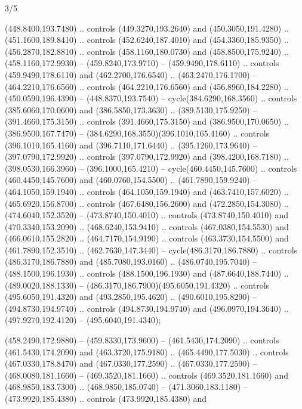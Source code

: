 \begin{flagdescription}{3/5}
\begin{scope}[shift={(0.5\flaglength,0.5\flagwidth)},scale=\flagwidth/510]
\begin{scope}[y=0.80pt, x=0.80pt, yscale=-1.06, xscale=1.06,yshift=-240pt,xshift=-400pt]
\begin{scope}[cm={{0.83333,0.0,0.0,0.83333,(154.64672,48.64761)}}]
\begin{scope}[cm={{0.93334,0.0,0.0,0.93334,(-4.86471,22.64035)}}]
\begin{scope}[line width=0.489\lw]
\begin{scope}[draw=black,fill=cd67c59]
 (448.8400,193.7480) .. controls (449.3270,193.2640) and
  (450.3050,191.4280) .. (451.1600,189.8410) .. controls (452.6240,187.4010) and
  (454.3360,185.9350) .. (456.2870,182.8810) .. controls (458.1160,180.0730) and
  (458.8500,175.9240) .. (458.1160,172.9930) -- (459.8240,173.9710) --
  (459.9490,178.6110) .. controls (459.9490,178.6110) and (462.2700,176.6540) ..
  (463.2470,176.1700) -- (464.2210,176.6560) .. controls (464.2210,176.6560) and
  (456.8960,184.2280) .. (450.0590,196.4390) -- (448.8370,193.7540) --
  cycle(384.6290,168.3560) .. controls (385.6060,170.0600) and
  (386.5850,173.3630) .. (389.5130,175.9250) -- (391.4660,175.3150) .. controls
  (391.4660,175.3150) and (386.9500,170.0650) .. (386.9500,167.7470) --
  (384.6290,168.3550)(396.1010,165.4160) .. controls (396.1010,165.4160) and
  (396.7110,171.6440) .. (395.1260,173.9640) -- (397.0790,172.9920) .. controls
  (397.0790,172.9920) and (398.4200,168.7180) .. (398.0530,166.3960) --
  (396.1000,165.4210) -- cycle(460.4450,145.7600) .. controls
  (460.4450,145.7600) and (460.0760,154.5500) .. (461.7890,159.9240) --
  (464.1050,159.1940) .. controls (464.1050,159.1940) and (463.7410,157.6020) ..
  (465.6920,156.8700) .. controls (467.6480,156.2600) and (472.2850,154.3080) ..
  (474.6040,152.3520) -- (473.8740,150.4010) .. controls (473.8740,150.4010) and
  (470.3340,153.2090) .. (468.6240,153.9410) .. controls (467.0380,154.5530) and
  (466.0610,155.2820) .. (464.7170,154.9190) .. controls (463.3730,154.5500) and
  (461.7890,152.3510) .. (462.7630,147.3440) -- cycle(486.3170,186.7880) ..
  controls (486.3170,186.7880) and (485.7080,193.0160) .. (486.0740,195.7040) --
  (488.1500,196.1930) .. controls (488.1500,196.1930) and (487.6640,188.7440) ..
  (489.0020,188.1330) -- (486.3170,186.7900)(495.6050,191.4320) .. controls
  (495.6050,191.4320) and (493.2850,195.4620) .. (490.6010,195.8290) --
  (494.8730,194.9740) .. controls (494.8730,194.9740) and (496.0970,194.3640) ..
  (497.9270,192.4120) -- (495.6040,191.4340);
\end{scope}
\begin{scope}[draw=c003300,fill=c338a00]
 (458.2490,172.9880) -- (459.8330,173.9600) --
  (461.5430,174.2090) .. controls (461.5430,174.2090) and (463.3720,175.9180) ..
  (465.4490,177.5030) .. controls (467.0330,178.8470) and (467.0330,177.2590) ..
  (467.0330,177.2590) -- (468.0080,181.1660) -- (469.3520,181.1660) .. controls
  (469.3520,181.1660) and (468.9850,183.7300) .. (468.9850,185.0740) --
  (471.3060,183.1180) -- (473.9920,185.4380) .. controls (473.9920,185.4380) and

\end{scope}
\end{scope}
\end{scope}
\end{scope}
\end{scope}
\end{scope}
\end{flagdescription}
